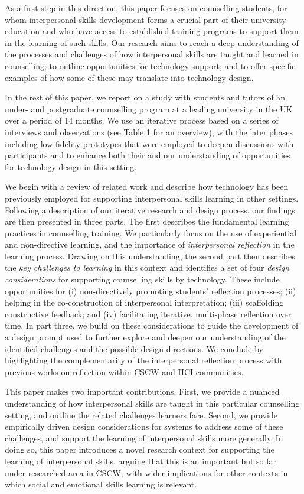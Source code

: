 \documentclass{sigchi}
\begin{document}
As a first step in this direction, this paper focuses on counselling students, for whom interpersonal skills development forms a crucial part of their university education and who have access to established training programs to support them in the learning of such skills. 
Our research aims to reach a deep understanding of the processes and challenges of how interpersonal skills are taught and learned in counselling; to outline opportunities for technology support; and to offer specific examples of how some of these may translate into technology design.

In the rest of this paper, we report on a study with students and tutors of an under- and postgraduate  counselling program at a leading university in the UK over a period of 14 months. We use an iterative process based on a series of interviews and observations (see Table 1 for an overview), with the later phases including low-fidelity prototypes that were employed to deepen discussions with participants and to enhance both their and our understanding of opportunities for technology design in this setting.

We begin with a review of related work and describe how technology has been previously employed for supporting interpersonal skills learning in other settings. Following a description of our iterative research and design process, our findings are then presented in three parts. The first describes the fundamental learning practices in counselling training. We particularly focus on the use of experiential and non-directive learning, and the importance of \emph{interpersonal reflection} in the learning process. Drawing on this understanding, the second part then describes the \emph{key challenges to learning} in this context and identifies a set of four \emph{design considerations} for supporting counselling skills by technology. These include opportunities for (i) non-directively promoting students' reflection processes; (ii) helping in the co-construction of interpersonal interpretation; (iii) scaffolding constructive feedback; and (iv) facilitating iterative, multi-phase reflection over time. In part three, we build on these considerations to guide the development of a design prompt used to further explore and deepen our understanding of the identified challenges and the possible design directions. We conclude by highlighting the complementarity of the interpersonal reflection process with previous works on reflection within CSCW and HCI communities. 

This paper makes two important contributions. First, we provide a nuanced understanding of how interpersonal skills are taught in this particular counselling setting, and outline the related challenges learners face. Second, we provide empirically driven design considerations for systems to address some of these challenges, and support the learning of interpersonal skills more generally. In doing so, this paper introduces a novel research context for supporting the learning of interpersonal skills, arguing that this is an important but so far under-researched area in CSCW, with wider implications for other contexts in which social and emotional skills learning is relevant.
\end{document}
